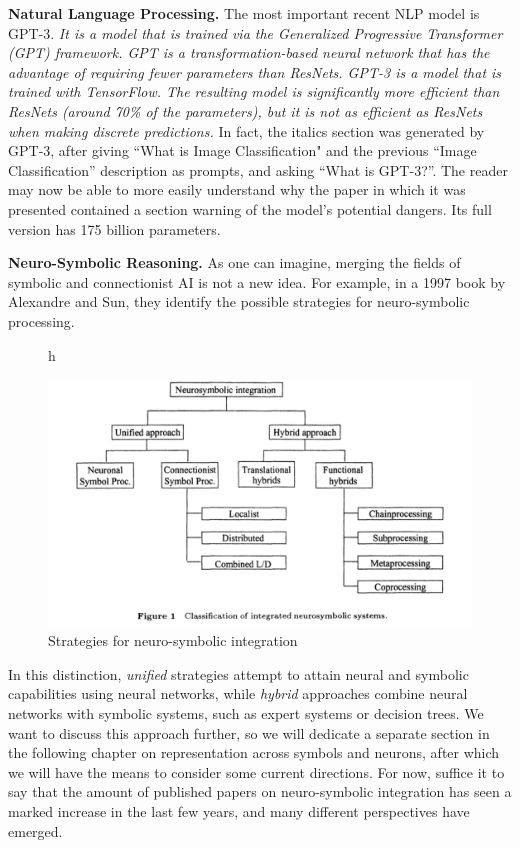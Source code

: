 \documentclass[../main.tex]{subfiles}
\begin{document}
\vspace{4pt}
\textbf{Natural Language Processing.} The most important recent NLP model is GPT-3. \textit{It is a model that is trained via the Generalized Progressive Transformer (GPT) framework. GPT is a transformation-based neural network that has the advantage of requiring fewer parameters than ResNets. GPT-3 is a model that is trained with TensorFlow. The resulting model is significantly more efficient than ResNets (around 70\% of the parameters), but it is not as efficient as ResNets when making discrete predictions.} In fact, the italics section was generated by GPT-3, after giving ``What is Image Classification" and the previous ``Image Classification'' description as prompts, and asking ``What is GPT-3?''. The reader may now be able to more easily understand why the paper in which it was presented contained a section warning of the model's potential dangers\cite{brownLanguageModelsAre2020}. Its full version has 175 billion parameters. 

\vspace{4pt}
\textbf{Neuro-Symbolic Reasoning.} As one can imagine, merging the fields of symbolic and connectionist AI is not a new idea. For example, in a 1997 book by Alexandre and Sun\cite{alexandreConnectionistSymbolicIntegrationUnified1997}, they identify the possible strategies for neuro-symbolic processing.
\begin{figure}{h}
    \centering
    \caption{Strategies for neuro-symbolic integration\cite{alexandreConnectionistSymbolicIntegrationUnified1997} }
    \includegraphics[width=\textwidth]{img/hybrid.png}
\end{figure}
In this distinction, \textit{unified} strategies attempt to attain neural and symbolic capabilities using neural networks, while \textit{hybrid} approaches combine neural networks with symbolic systems, such as expert systems or decision trees. We want to discuss this approach further, so we will dedicate a separate section in the following chapter on representation across symbols and neurons, after which we will have the means to consider some current directions. For now, suffice it to say that the amount of published papers on neuro-symbolic integration has seen a marked increase in the last few years, and many different perspectives have emerged.
\end{document}
